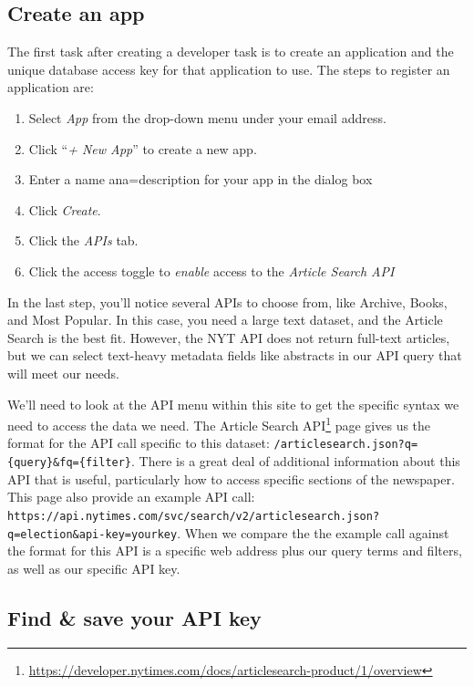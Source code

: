 \documentclass[
  krantz2]{krantz}
\providecommand{\tightlist}{%
  \setlength{\itemsep}{0pt}\setlength{\parskip}{0pt}}
\begin{document}
\hypertarget{create-app}{%
\subsection{Create an app}\label{create-app}}

The first task after creating a developer task is to create an application and the unique database access key for that application to use. The steps to register an application\citep{get-started} are:

\begin{enumerate}
\def\labelenumi{\arabic{enumi}.}
\tightlist
\item
  Select \emph{App} from the drop-down menu under your email address.
\item
  Click ``\emph{+ New App}'' to create a new app.
\item
  Enter a name ana=description for your app in the dialog box
\item
  Click \emph{Create}.
\item
  Click the \emph{APIs} tab.
\item
  Click the access toggle to \emph{enable} access to the \emph{Article Search API}
\end{enumerate}

In the last step, you'll notice several APIs to choose from, like Archive, Books, and Most Popular. In this case, you need a large text dataset, and the Article Search is the best fit. However, the NYT API does not return full-text articles, but we can select text-heavy metadata fields like abstracts in our API query that will meet our needs.

We'll need to look at the API menu within this site to get the specific syntax we need to access the data we need. The Article Search API\footnote{\url{https://developer.nytimes.com/docs/articlesearch-product/1/overview}} page gives us the format for the API call specific to this dataset: \texttt{/articlesearch.json?q=\{query\}\&fq=\{filter\}}. There is a great deal of additional information about this API that is useful, particularly how to access specific sections of the newspaper. This page also provide an example API call: \texttt{https://api.nytimes.com/svc/search/v2/articlesearch.json?q=election\&api-key=yourkey}. When we compare the the example call against the format for this API is a specific web address plus our query terms and filters, as well as our specific API key.

\hypertarget{nyt-key}{%
\subsection{Find \& save your API key}\label{nyt-key}}
\end{document}
